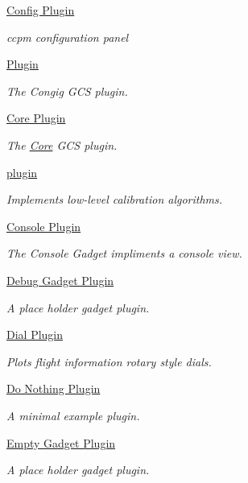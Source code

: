 \begin{DoxyCompactItemize}
\hyperlink{group___config_plugin}{Config Plugin}
\begin{DoxyCompactList}\small\item\em ccpm configuration panel \end{DoxyCompactList}\item 
\hyperlink{group___congig}{Plugin}
\begin{DoxyCompactList}\small\item\em The Congig G\-C\-S plugin. \end{DoxyCompactList}\item 
\hyperlink{group___core_plugin}{Core Plugin}
\begin{DoxyCompactList}\small\item\em The \hyperlink{namespace_core}{Core} G\-C\-S plugin. \end{DoxyCompactList}\item 
\hyperlink{group___config}{plugin}
\begin{DoxyCompactList}\small\item\em Implements low-\/level calibration algorithms. \end{DoxyCompactList}\item 
\hyperlink{group___console_plugin}{Console Plugin}
\begin{DoxyCompactList}\small\item\em The Console Gadget impliments a console view. \end{DoxyCompactList}\item 
\hyperlink{group___debug_gadget_plugin}{Debug Gadget Plugin}
\begin{DoxyCompactList}\small\item\em A place holder gadget plugin. \end{DoxyCompactList}\item 
\hyperlink{group___dial_plugin}{Dial Plugin}
\begin{DoxyCompactList}\small\item\em Plots flight information rotary style dials. \end{DoxyCompactList}\item 
\hyperlink{group___do_nothing_plugin}{Do Nothing Plugin}
\begin{DoxyCompactList}\small\item\em A minimal example plugin. \end{DoxyCompactList}\item 
\hyperlink{group___empty_gadget_plugin}{Empty Gadget Plugin}
\begin{DoxyCompactList}\small\item\em A place holder gadget plugin. \end{DoxyCompactList}\item 

\end{DoxyCompactItemize}
